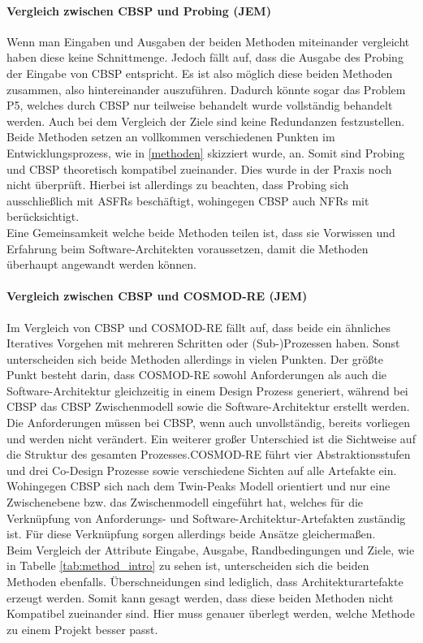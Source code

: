 \paragraph{Vergleich zwischen CBSP und Probing (JEM)}
Wenn man Eingaben und Ausgaben der beiden Methoden miteinander vergleicht haben diese keine Schnittmenge. Jedoch fällt auf, dass die Ausgabe des Probing der Eingabe von CBSP entspricht. Es ist also möglich diese beiden Methoden zusammen, also hintereinander auszuführen. Dadurch könnte sogar das Problem P5, welches durch CBSP nur teilweise behandelt wurde vollständig behandelt werden. Auch bei dem Vergleich der Ziele sind keine Redundanzen festzustellen. Beide Methoden setzen an vollkommen verschiedenen Punkten im Entwicklungsprozess, wie in \ref{methoden} skizziert wurde, an. Somit sind Probing und CBSP theoretisch kompatibel zueinander. Dies wurde in der Praxis noch nicht überprüft. Hierbei ist allerdings zu beachten, dass Probing sich ausschließlich mit ASFRs beschäftigt, wohingegen CBSP auch NFRs mit berücksichtigt. \\ 
Eine Gemeinsamkeit welche beide Methoden teilen ist, dass sie Vorwissen und Erfahrung beim Software-Architekten voraussetzen, damit die Methoden überhaupt angewandt werden können. \\

\paragraph{Vergleich zwischen CBSP und COSMOD-RE (JEM)}
Im Vergleich von CBSP und COSMOD-RE fällt auf, dass beide ein ähnliches Iteratives Vorgehen mit mehreren Schritten oder (Sub-)Prozessen haben. Sonst unterscheiden sich beide Methoden allerdings in vielen Punkten. Der größte Punkt besteht darin, dass COSMOD-RE sowohl Anforderungen als auch die Software-Architektur gleichzeitig in einem Design Prozess generiert, während bei CBSP das CBSP Zwischenmodell sowie die Software-Architektur erstellt werden. Die Anforderungen müssen bei CBSP, wenn auch unvollständig, bereits vorliegen und werden nicht verändert. Ein weiterer großer Unterschied ist die Sichtweise auf die Struktur des gesamten Prozesses.COSMOD-RE führt vier Abstraktionsstufen und drei Co-Design Prozesse sowie verschiedene Sichten auf alle Artefakte ein. Wohingegen CBSP sich nach dem Twin-Peaks Modell orientiert und nur eine Zwischenebene bzw. das Zwischenmodell eingeführt hat, welches für die Verknüpfung von Anforderungs- und Software-Architektur-Artefakten zuständig ist. Für diese Verknüpfung sorgen allerdings beide Ansätze gleichermaßen. \\
Beim Vergleich der Attribute Eingabe, Ausgabe, Randbedingungen und Ziele, wie in Tabelle \ref{tab:method_intro} zu sehen ist, unterscheiden sich die beiden Methoden ebenfalls. Überschneidungen sind lediglich, dass Architekturartefakte erzeugt werden. Somit kann gesagt werden, dass diese beiden Methoden nicht Kompatibel zueinander sind. Hier muss genauer überlegt werden, welche Methode zu einem Projekt besser passt. \\

